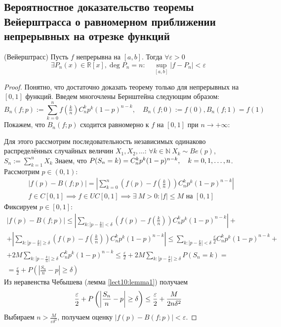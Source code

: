 	\subsection{Вероятностное доказательство теоремы Вейерштрасса о равномерном приближении непрерывных на отрезке функций}
		\begin{theorem}\label{lect10:th2}
			(Вейерштрасс)
			Пусть $f$ непрерывна на $[a, b]$. Тогда $\forall \varepsilon > 0$\begin{equation*}
				\exists P_n(x)\in \mathbb{R}[x], \operatorname{deg} P_n = n: \quad \sup_{[a, b]}\left|f - P_n\right|<\varepsilon
			\end{equation*}
		\end{theorem}
		\begin{proof}
			Понятно, что достаточно доказать теорему только для непрерывных на $[0, 1]$ функций.
			Введем многочлены Бернштейна следующим образом:
			\begin{equation*}
				B_n(f; p):=\sum_{k=0}^{n} f(\tfrac{k}{n})C_n^k p^k (1 - p)^{n-k}, \quad B_n(f; 0) := f(0), B_n(f; 1) = f(1)
			\end{equation*}
			Покажем, что $B_n(f; p)$ сходится равномерно к $f$ на $[0, 1]$ при $n\to +\infty$:

			Для этого рассмотрим последовательность независимых одинаково распределённых случайных величин $X_1, X_2, \dots$: $\forall k\in\mathbb{N} \ X_k \sim Be(p)$, $S_n :=\sum_{k=1}^{n} X_k$
			Знаем, что $\P(S_n = k) = C_n^k p^k (1-p)^{n-k},\quad k = 0, 1, \dots, n$. Рассмотрим $p\in\left(0, 1\right)$:
			\begin{align*}
				&\left|f(p)-B(f;p)\right|=\left|\sum_{k=0}^{n} \left(f\left(p\right)-f\left(\frac{k}{n}\right)\right) C_n^k p^k (1 - p)^{n-k}\right|\\
				& f\in C[0, 1] \implies f\in UC[0, 1] \implies \exists \ M > 0\colon |f|\leq M \text{ на } [0, 1]
			\end{align*}
			Фиксируем $p\in[0,1]$:
			\begin{multline*}
				\left|f(p)-B(f;p)\right| \leq \left|\sum_{k\colon |p-\frac{k}{n}|<\delta} \left(f\left(p\right)-f\left(\frac{k}{n}\right)\right) C_n^k p^k (1 - p)^{n-k}\right|+\\+
				\left|\sum_{k\colon |p-\frac{k}{n}|\geq\delta} \left(f\left(p\right)-f\left(\frac{k}{n}\right)\right) C_n^k p^k (1 - p)^{n-k}\right|\leq  \sum_{k\colon |p-\frac{k}{n}|<\delta} \frac{\varepsilon}{2} C_n^k p^k (1 - p)^{n-k} +\\+
				2M \sum_{k\colon |p-\frac{k}{n}|\geq\delta} C_n^k p^k (1 - p)^{n-k}\leq \frac{\varepsilon}{2} + 2M\sum_{k\colon |p-\frac{k}{n}|\geq\delta} P(S_n = k) =\\=\frac{\varepsilon}{2}+P\left(\left|\frac{S_n}{n} - p\right|\geq \delta\right)
			\end{multline*}
			Из неравенства Чебышева (лемма \ref{lect10:lemma1}) получаем
			\begin{equation*}
				\frac{\varepsilon}{2}+\P\left(\left|\frac{S_n}{n} - p\right|\geq \delta\right)\leq \frac{\varepsilon}{2} + \frac{M}{2n\delta^2}
			\end{equation*}
			Выбираем $n>\frac{M}{\varepsilon \delta^2}$, получаем оценку $\left|f(p)-B(f;p)\right|<\varepsilon$.
		\end{proof}
